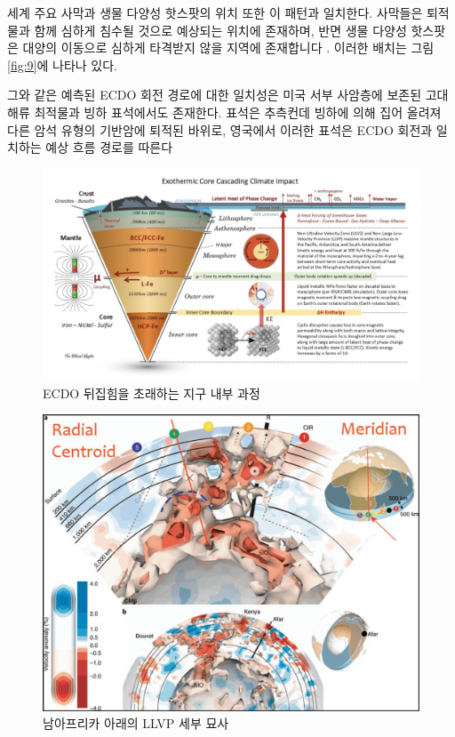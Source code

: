 \documentclass[10pt,twocolumn,letterpaper]{article}
\begin{document}
세계 주요 사막과 생물 다양성 핫스팟의 위치 또한 이 패턴과 일치한다. 사막들은 퇴적물과 함께 심하게 침수될 것으로 예상되는 위치에 존재하며, 반면 생물 다양성 핫스팟은 대양의 이동으로 심하게 타격받지 않을 지역에 존재합니다 \cite{28}. 이러한 배치는 그림 \ref{fig:9}에 나타나 있다.

그와 같은 예측된 ECDO 회전 경로에 대한 일치성은  미국 서부 사암층에 보존된 고대 해류 최적물과 빙하 표석에서도 존재한다. 표석은 추측컨데 빙하에 의해 집어 올려져 다른 암석 유형의 기반암에 퇴적된 바위로,  영국에서 이러한 표석은  ECDO 회전과 일치하는 예상 흐름 경로를 따른다 \cite{67,68}

\begin{figure}[b]
\begin{center}
\includegraphics[width=1\textwidth]{layers.jpg}
\end{center}
   \caption{ECDO 뒤집힘을 초래하는 지구 내부 과정 \cite{129}}
\label{fig:11}
\end{figure}

\begin{figure}[t]
\begin{center}
   \includegraphics[width=1\linewidth]{llvp.jpg}
\end{center}
   \caption{남아프리카 아래의 LLVP 세부 묘사 \cite{28}}
\label{fig:12}
\label{fig:onecol}
\end{figure}
\end{document}
